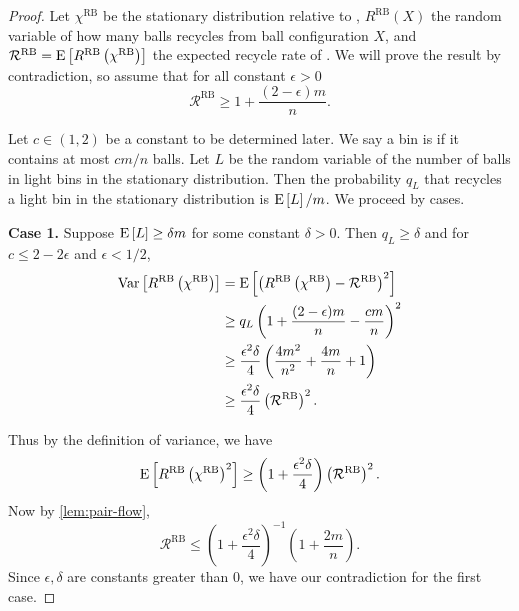 \begin{proof}
	Let $\chi^\textrm{RB}$ be the stationary distribution relative to \RB,
	$R^\textrm{RB}(X)$ the random variable of how many balls \RB recycles from
	ball configuration $X$, and $\mathcal{R}^\textrm{RB} =
	\mathrm{E}\left[R^\textrm{RB}\left(\chi^\textrm{RB}\right)\right]$ the expected recycle rate
	of \RB.  We will prove the result by contradiction, so assume that for all 
	constant $\epsilon > 0$
	\[\mathcal{R}^\textrm{RB} \geq 1 + \frac{(2-\epsilon)m}{n}.\]

	Let $c\in(1,2)$ be a constant to be determined later. We say a bin is
	 if it contains at most $cm/n$ balls. Let $L$ be the random
	variable of the number of balls in light bins in the stationary
	distribution. Then the probability $q_L$ that \RB recycles a light bin in
	the stationary distribution is $\mathrm{E}\left[L\right]/m$. We proceed by cases.

{\bf Case 1.} Suppose $\mathrm{E}\left[L\right] \geq \delta m$ for some constant $\delta > 0$. Then $q_L \geq \delta$ and for $c \leq 2 - 2\epsilon$ and $\epsilon < 1/2$,
\begin{align*}
	\mathrm{Var}\left[R^\textrm{RB}\left(\chi^\textrm{RB}\right)\right] 
	&= \mathrm{E}\left[\left(R^\textrm{RB}\left(\chi^\textrm{RB}\right) - \mathcal{R}^\textrm{RB}\right)^2\right]  \\
	&\ge q_L \left(1+\frac{(2-\epsilon)m}{n}-\frac{cm}{n}\right)^2 \\
	&\ge \frac{\epsilon^2\delta}{4} \left(\frac{4m^2}{n^2}+\frac{4m}{n}+1\right) \\
	&\ge \frac{\epsilon^2 \delta}{4} \left(\mathcal{R}^\textrm{RB}\right)^2. \label{eqn:varFl}
\end{align*}

Thus by the definition of variance, we have
\begin{equation*}
	\mathrm{E}\left[R^\textrm{RB}\left(\chi^\textrm{RB}\right)^2\right] \ge \left(1+\frac{\epsilon^2\delta}{4}\right)\left(\mathcal{R}^\textrm{RB}\right)^2. \label{eqn:expF2l}
\end{equation*}
	Now by \cref{lem:pair-flow},
\begin{equation*}
	\mathcal{R}^\textrm{RB} \le \left(1+\frac{\epsilon^2\delta}{4}\right)^{-1}\left(1+\frac{2m}{n}\right).
\end{equation*}
Since $\epsilon, \delta$ are constants greater than $0$, we have our contradiction for
	the first case. 


\end{proof}

